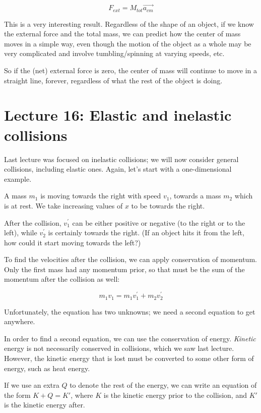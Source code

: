 \begin{equation}
F_{ext} = M_{tot} \vec{a_{cm}}
\end{equation}

This is a very interesting result. Regardless of the shape of an object, if we know the external force and the total mass, we can predict how the center of mass moves in a simple way, even though the motion of the object as a whole may be very complicated and involve tumbling/spinning at varying speeds, etc.

So if the (net) external force is zero, the center of mass will continue to move in a straight line, forever, regardless of what the rest of the object is doing.

\section{Lecture 16: Elastic and inelastic collisions}

Last lecture was focused on inelastic collisions; we will now consider general collisions, including elastic ones. Again, let's start with a one-dimensional example.

A mass $m_1$ is moving towards the right with speed $v_1$, towards a mass $m_2$ which is at rest. We take increasing values of $x$ to be towards the right.

After the collision, $v_1^{'}$ can be either positive or negative (to the right or to the left), while $v_2^{'}$ is certainly towards the right. (If an object hits it from the left, how could it start moving towards the left?)

To find the velocities after the collision, we can apply conservation of momentum. Only the first mass had any momentum prior, so that must be the sum of the momentum after the collision as well:

\begin{equation}
m_1 v_1 = m_1 v_1^{'} + m_2 v_2^{'}
\end{equation}

Unfortunately, the equation has two unknowns; we need a second equation to get anywhere.

In order to find a second equation, we can use the conservation of energy. \emph{Kinetic} energy is not necessarily conserved in collisions, which we saw last lecture. However, the kinetic energy that is lost must be converted to some other form of energy, such as heat energy.

If we use an extra $Q$ to denote the rest of the energy, we can write an equation of the form $K + Q = K'$, where $K$ is the kinetic energy prior to the collision, and $K'$ is the kinetic energy after.


